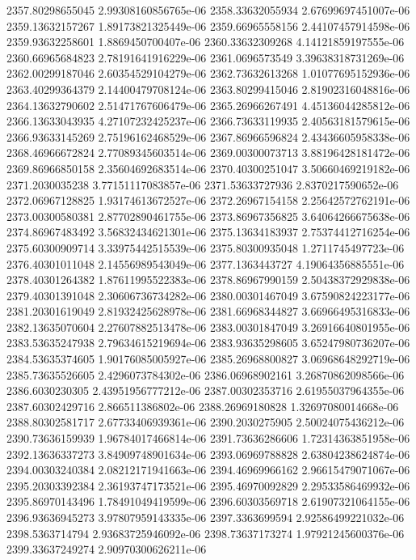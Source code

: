{2357.80298655045 2.99308160856765e-06
2358.33632055934 2.67699697451007e-06
2359.13632157267 1.89173821325449e-06
2359.66965558156 2.44107457914598e-06
2359.93632258601 1.8869450700407e-06
2360.33632309268 4.14121859197555e-06
2360.66965684823 2.78191641916229e-06
2361.0696573549 3.39638318731269e-06
2362.00299187046 2.60354529104279e-06
2362.73632613268 1.01077695152936e-06
2363.40299364379 2.14400479708124e-06
2363.80299415046 2.81902316048816e-06
2364.13632790602 2.51471767606479e-06
2365.26966267491 4.45136044285812e-06
2366.13633043935 4.27107232425237e-06
2366.73633119935 2.40563181579615e-06
2366.93633145269 2.75196162468529e-06
2367.86966596824 2.43436605958338e-06
2368.46966672824 2.77089345603514e-06
2369.00300073713 3.88196428181472e-06
2369.86966850158 2.35604692683514e-06
2370.40300251047 3.50660469219182e-06
2371.2030035238 3.77151117083857e-06
2371.53633727936 2.8370217590652e-06
2372.06967128825 1.93174613672527e-06
2372.26967154158 2.25642572762191e-06
2373.00300580381 2.87702890461755e-06
2373.86967356825 3.64064266675638e-06
2374.86967483492 3.56832434621301e-06
2375.13634183937 2.75374412716254e-06
2375.60300909714 3.33975442515539e-06
2375.80300935048 1.2711745497723e-06
2376.40301011048 2.14556989543049e-06
2377.1363443727 4.19064356885551e-06
2378.40301264382 1.87611995522383e-06
2378.86967990159 2.50438372929838e-06
2379.40301391048 2.30606736734282e-06
2380.00301467049 3.67590824223177e-06
2381.20301619049 2.81932425628978e-06
2381.66968344827 3.66966495316833e-06
2382.13635070604 2.27607882513478e-06
2383.00301847049 3.26916640801955e-06
2383.53635247938 2.79634615219694e-06
2383.93635298605 3.65247980736207e-06
2384.53635374605 1.90176085005927e-06
2385.26968800827 3.06968648292719e-06
2385.73635526605 2.4296073784302e-06
2386.06968902161 3.26870862098566e-06
2386.6030230305 2.43951956777212e-06
2387.00302353716 2.61955037964355e-06
2387.60302429716 2.866511386802e-06
2388.26969180828 1.32697080014668e-06
2388.80302581717 2.67733406939361e-06
2390.2030275905 2.50024075436212e-06
2390.73636159939 1.96784017466814e-06
2391.73636286606 1.72314363851958e-06
2392.13636337273 3.84909748901634e-06
2393.06969788828 2.63804238624874e-06
2394.00303240384 2.08212171941663e-06
2394.46969966162 2.96615479071067e-06
2395.20303392384 2.36193747173521e-06
2395.46970092829 2.29533586469932e-06
2395.86970143496 1.78491049419599e-06
2396.60303569718 2.61907321064155e-06
2396.93636945273 3.97807959143335e-06
2397.3363699594 2.92586499221032e-06
2398.5363714794 2.93683725946092e-06
2398.73637173274 1.97921245600376e-06
2399.33637249274 2.90970300626211e-06
}
